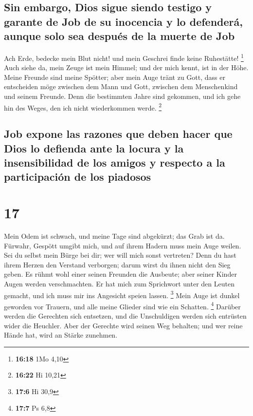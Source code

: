 \hypertarget{sin-embargo-dios-sigue-siendo-testigo-y-garante-de-job-de-su-inocencia-y-lo-defenderuxe1-aunque-solo-sea-despuuxe9s-de-la-muerte-de-job}{%
\subsection{Sin embargo, Dios sigue siendo testigo y garante de Job de
su inocencia y lo defenderá, aunque solo sea después de la muerte de
Job}\label{sin-embargo-dios-sigue-siendo-testigo-y-garante-de-job-de-su-inocencia-y-lo-defenderuxe1-aunque-solo-sea-despuuxe9s-de-la-muerte-de-job}}

 Ach Erde, bedecke mein Blut nicht! und mein Geschrei
finde keine Ruhestätte! \footnote{\textbf{16:18} 1Mo 4,10}
 Auch siehe da, mein Zeuge ist mein Himmel; und der mich
kennt, ist in der Höhe.  Meine Freunde sind meine
Spötter; aber mein Auge tränt zu Gott,  dass er
entscheiden möge zwischen dem Mann und Gott, zwischen dem Menschenkind
und seinem Freunde.  Denn die bestimmten Jahre sind
gekommen, und ich gehe hin des Weges, den ich nicht wiederkommen werde.
\footnote{\textbf{16:22} Hi 10,21}

\hypertarget{job-expone-las-razones-que-deben-hacer-que-dios-lo-defienda-ante-la-locura-y-la-insensibilidad-de-los-amigos-y-respecto-a-la-participaciuxf3n-de-los-piadosos}{%
\subsection{Job expone las razones que deben hacer que Dios lo defienda
ante la locura y la insensibilidad de los amigos y respecto a la
participación de los
piadosos}\label{job-expone-las-razones-que-deben-hacer-que-dios-lo-defienda-ante-la-locura-y-la-insensibilidad-de-los-amigos-y-respecto-a-la-participaciuxf3n-de-los-piadosos}}

\hypertarget{section-16}{%
\section{17}\label{section-16}}

 Mein Odem ist schwach, und meine Tage sind abgekürzt; das
Grab ist da.  Fürwahr, Gespött umgibt mich, und auf ihrem
Hadern muss mein Auge weilen.  Sei du selbst mein Bürge
bei dir; wer will mich sonst vertreten?  Denn du hast
ihrem Herzen den Verstand verborgen; darum wirst du ihnen nicht den Sieg
geben.  Es rühmt wohl einer seinen Freunden die Ausbeute;
aber seiner Kinder Augen werden verschmachten.  Er hat
mich zum Sprichwort unter den Leuten gemacht, und ich muss mir ins
Angesicht speien lassen. \footnote{\textbf{17:6} Hi 30,9} 
Mein Auge ist dunkel geworden vor Trauern, und alle meine Glieder sind
wie ein Schatten. \footnote{\textbf{17:7} Ps 6,8}  Darüber
werden die Gerechten sich entsetzen, und die Unschuldigen werden sich
entrüsten wider die Heuchler.  Aber der Gerechte wird
seinen Weg behalten; und wer reine Hände hat, wird an Stärke zunehmen.

